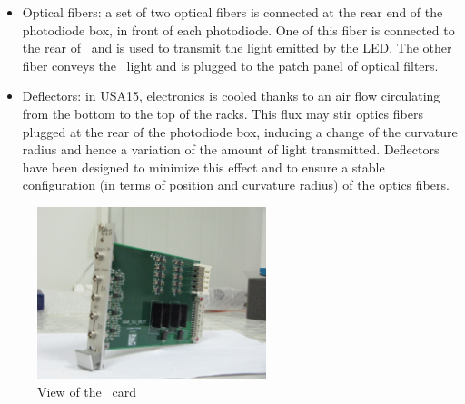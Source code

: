 \begin{itemize}
\item Optical fibers: a set of two optical fibers is connected at the rear end of the photodiode box, in front of each photodiode. One of this fiber is connected to the rear of \phocal~and is used to transmit the light emitted by the LED. The other fiber conveys the \laser~light and is plugged to the patch panel of optical filters. 
\item Deflectors: in USA15, electronics is cooled thanks to an air flow circulating from the bottom to the top of the racks. This flux may stir optics fibers plugged at the rear of the photodiode box, inducing a change of the curvature radius and hence a variation of the amount of light transmitted. Deflectors have been designed to minimize this effect and to ensure a stable configuration (in terms of position and curvature radius) of the optics fibers.
\end{itemize}

\begin{figure}[htbp]
\centering
\includegraphics[height=5cm]{figures/cis.JPG}
\caption{View of the  \charinjsplit~card}\label{fig:lascis}
\end{figure}
